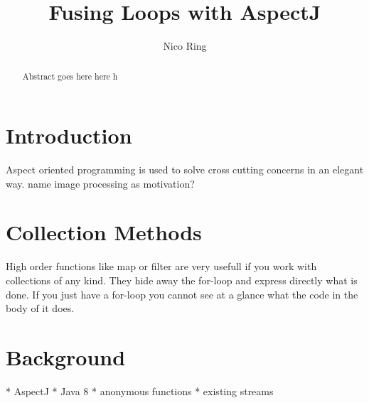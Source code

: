 \documentclass[runningheads,a4paper]{llncs}
\begin{document}


\title{Fusing Loops with AspectJ}

\author{Nico Ring}

\maketitle

\begin{abstract}
Abstract goes here here h
\end{abstract}


\section{Introduction}\label{sec:intro}
Aspect oriented programming is used to solve cross cutting concerns in an elegant way.
name image processing as motivation?
\section{Collection Methods}\label{sec:intro}
High order functions like map or filter are very usefull if you work with collections of any kind.
They hide away the for-loop and express directly what is done. If you just have a for-loop you cannot see at a glance what the code in the body of it does.


\section{Background}\label{sec:intro}
* AspectJ
* Java 8
  * anonymous functions
  * existing streams
\end{document}
